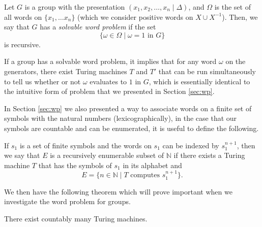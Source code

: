 \begin{definition}
  \label{def:wp}
  Let $G$ is a group with the presentation $(x_1,x_2, \dots, x_n \mid \Delta)$, and $\Omega$ is the set of all words on $\{x_1, \dots x_n\}$ (which we consider positive words on $X \cup X^{-1}$). Then, we say that $G$ has a \emph{solvable word problem} if the set
  \begin{equation*}
    \{\omega \in \Omega \mid \omega = 1 \text{ in } G \}
  \end{equation*}
  is recursive.
\end{definition}

If a group has a solvable word problem, it implies that for any word $\omega$ on the generators, there exist Turing machines $T$ and $T'$ that can be run simultaneously to tell us whether or not $\omega$ evaluates to $1$ in $G$, which is essentially identical to the intuitive form of problem that we presented in Section \ref{sec:wp}.

In Section \ref{sec:wp} we also presented a way to associate words on a finite set of symbols with the natural numbers (lexicographically), in the case that our symbols are countable and can be enumerated, it is useful to define the following.
\begin{definition}
  If $s_1$ is a set of finite symbols and the words on $s_1$ can be indexed by $s_1^{n+1}$, then we say that $E$ is a recursively enumerable subset of $\mathbb{N}$ if there exists a Turing machine $T$ that has the symbols of $s_1$ in its alphabet and
  \begin{equation*}
    E = \{n \in \mathbb{N} \mid T \text{ computes } s_1^{n+1}\}.
  \end{equation*}
\end{definition}

We then have the following theorem which will prove important when we investigate the word problem for groups.

\begin{lemma}
  \label{lem:turing-countable}
  There exist countably many Turing machines.
\end{lemma}

